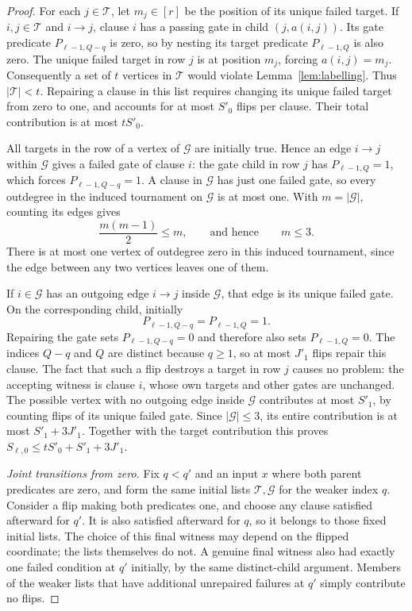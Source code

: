 \begin{proof}
For each $j\in\mathcal T$, let $m_j\in[r]$ be the position of its
unique failed target.  If $i,j\in\mathcal T$ and $i\to j$, clause
$i$ has a passing gate in child $(j,a(i,j))$.  Its gate predicate
$P_{\ell-1,Q-q}$ is zero, so by nesting its target predicate
$P_{\ell-1,Q}$ is also zero.  The unique failed target in row $j$
is at position $m_j$, forcing $a(i,j)=m_j$.  Consequently a set of
$t$ vertices in $\mathcal T$ would violate Lemma~\ref{lem:labelling}.
Thus $|\mathcal T|<t$.  Repairing a clause in this list requires
changing its unique failed target from zero to one, and accounts for
at most $S'_0$ flips per clause.  Their total contribution is at most
$tS'_0$.

All targets in the row of a vertex of $\mathcal G$ are initially
true.  Hence an edge $i\to j$ within $\mathcal G$ gives a failed
gate of clause $i$: the gate child in row $j$ has
$P_{\ell-1,Q}=1$, which forces $P_{\ell-1,Q-q}=1$.  A clause in
$\mathcal G$ has just one failed gate, so every outdegree in the
induced tournament on $\mathcal G$ is at most one.  With
$m=|\mathcal G|$, counting its edges gives
\[
 \frac{m(m-1)}2\leq m,
 \qquad\text{and hence}\qquad m\leq3.
\]
There is at most one vertex of outdegree zero in this induced
tournament, since the edge between any two vertices leaves one of
them.

If $i\in\mathcal G$ has an outgoing edge $i\to j$ inside
$\mathcal G$, that edge is its unique failed gate.  On the
corresponding child, initially
\[
 P_{\ell-1,Q-q}=P_{\ell-1,Q}=1.
\]
Repairing the gate sets $P_{\ell-1,Q-q}=0$ and therefore also sets
$P_{\ell-1,Q}=0$.  The indices $Q-q$ and $Q$ are distinct because
$q\geq1$, so at most $J'_1$ flips repair this clause.  The fact that
such a flip destroys a target in row $j$ causes no problem: the
accepting witness is clause $i$, whose own targets and other gates
are unchanged.  The possible vertex with no outgoing edge inside
$\mathcal G$ contributes at most $S'_1$, by counting flips of its
unique failed gate.  Since $|\mathcal G|\leq3$, its entire
contribution is at most $S'_1+3J'_1$.  Together with the target
contribution this proves
$S_{\ell,0}\leq tS'_0+S'_1+3J'_1$.

\emph{Joint transitions from zero.}
Fix $q<q'$ and an input $x$ where both parent predicates are zero,
and form the same initial lists $\mathcal T,\mathcal G$ for the
weaker index $q$.  Consider a flip making both predicates one, and
choose any clause satisfied afterward for $q'$.  It is also satisfied
afterward for $q$, so it belongs to those fixed initial lists.  The
choice of this final witness may depend on the flipped coordinate;
the lists themselves do not.  A genuine final witness also had
exactly one failed condition at $q'$ initially, by the same
distinct-child argument.  Members of the weaker lists that have
additional unrepaired failures at $q'$ simply contribute no flips.


\end{proof}
